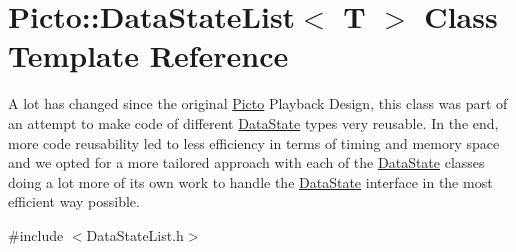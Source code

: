 \hypertarget{class_picto_1_1_data_state_list}{\section{Picto\-:\-:Data\-State\-List$<$ T $>$ Class Template Reference}
\label{class_picto_1_1_data_state_list}
}


A lot has changed since the original \hyperlink{namespace_picto}{Picto} Playback Design, this class was part of an attempt to make code of different \hyperlink{class_picto_1_1_data_state}{Data\-State} types very reusable. In the end, more code reusability led to less efficiency in terms of timing and memory space and we opted for a more tailored approach with each of the \hyperlink{class_picto_1_1_data_state}{Data\-State} classes doing a lot more of its own work to handle the \hyperlink{class_picto_1_1_data_state}{Data\-State} interface in the most efficient way possible.  




{\ttfamily \#include $<$Data\-State\-List.\-h$>$}

